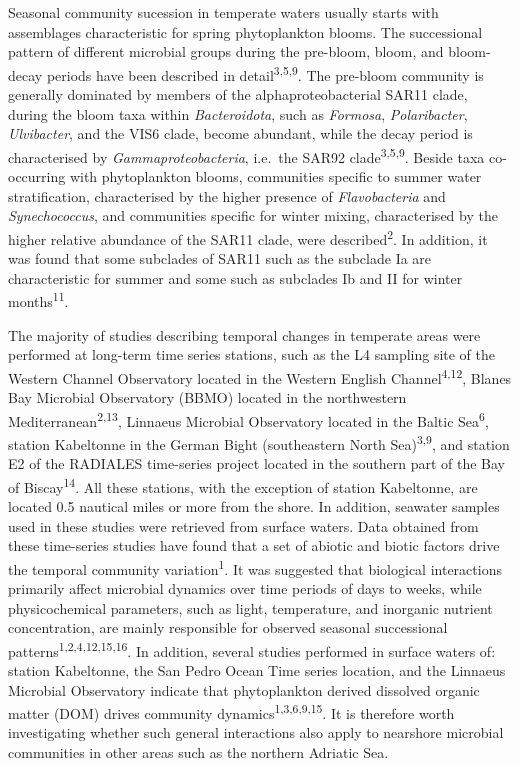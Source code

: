 \documentclass[
  12pt,
]{article}
\begin{document}
Seasonal community sucession in temperate waters usually starts with
assemblages characteristic for spring phytoplankton blooms. The
successional pattern of different microbial groups during the pre-bloom,
bloom, and bloom-decay periods have been described in
detail\textsuperscript{3,5,9}. The pre-bloom community is generally
dominated by members of the alphaproteobacterial SAR11 clade, during the
bloom taxa within \emph{Bacteroidota}, such as \emph{Formosa},
\emph{Polaribacter}, \emph{Ulvibacter}, and the VIS6 clade, become
abundant, while the decay period is characterised by
\emph{Gammaproteobacteria}, i.e.~the SAR92 clade\textsuperscript{3,5,9}.
Beside taxa co-occurring with phytoplankton blooms, communities specific
to summer water stratification, characterised by the higher presence of
\emph{Flavobacteria} and \emph{Synechococcus}, and communities specific
for winter mixing, characterised by the higher relative abundance of the
SAR11 clade, were described\textsuperscript{2}. In addition, it was
found that some subclades of SAR11 such as the subclade Ia are
characteristic for summer and some such as subclades Ib and II for
winter months\textsuperscript{11}.

The majority of studies describing temporal changes in temperate areas
were performed at long-term time series stations, such as the L4
sampling site of the Western Channel Observatory located in the Western
English Channel\textsuperscript{4,12}, Blanes Bay Microbial Observatory
(BBMO) located in the northwestern Mediterranean\textsuperscript{2,13},
Linnaeus Microbial Observatory located in the Baltic
Sea\textsuperscript{6}, station Kabeltonne in the German Bight
(southeastern North Sea)\textsuperscript{3,9}, and station E2 of the
RADIALES time-series project located in the southern part of the Bay of
Biscay\textsuperscript{14}. All these stations, with the exception of
station Kabeltonne, are located 0.5 nautical miles or more from the
shore. In addition, seawater samples used in these studies were
retrieved from surface waters. Data obtained from these time-series
studies have found that a set of abiotic and biotic factors drive the
temporal community variation\textsuperscript{1}. It was suggested that
biological interactions primarily affect microbial dynamics over time
periods of days to weeks, while physicochemical parameters, such as
light, temperature, and inorganic nutrient concentration, are mainly
responsible for observed seasonal successional
patterns\textsuperscript{1,2,4,12,15,16}. In addition, several studies
performed in surface waters of: station Kabeltonne, the San Pedro Ocean
Time series location, and the Linnaeus Microbial Observatory indicate
that phytoplankton derived dissolved organic matter (DOM) drives
community dynamics\textsuperscript{1,3,6,9,15}. It is therefore worth
investigating whether such general interactions also apply to nearshore
microbial communities in other areas such as the northern Adriatic Sea.
\end{document}
